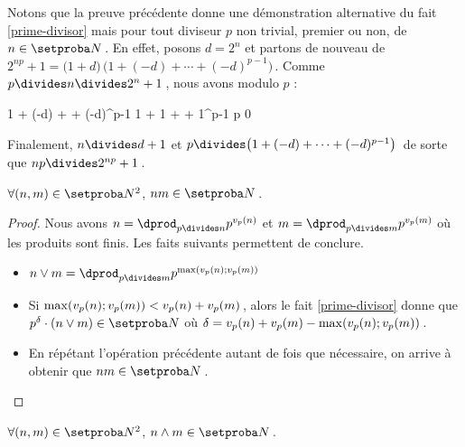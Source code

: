 Notons que la preuve précédente donne une démonstration alternative du fait \ref{prime-divisor} mais pour tout diviseur $p$ non trivial, premier ou non, de $n \in \ourset$\,.
En effet,
posons $d = 2^n$ et partons de nouveau de $2^{np} + 1 = \big( 1 + d \big) \, \big( 1 + (-d) + \cdots + (-d)^{p-1}  \big)$\,.
Comme $p \divides n \divides 2^n + 1$\,, nous avons modulo $p$ :

\medskip

\begin{stepcalc}[style = ar*, ope = \equiv]
	1 + (-d) + \cdots + (-d)^{p-1} 
	1 + 1 + \cdots + 1^{p-1} 
\explnext{}
	p
\explnext{}
	0
\end{stepcalc}

\medskip 

Finalement,
$n \divides d + 1$ et $p \divides \big( 1 + (-d) + \cdots + (-d)^{p-1}  \big)$\, de sorte que $n p \divides 2^{n p} + 1$\,.




\begin{fact} \label{product}
	$\forall (n , m) \in \ourset^2$, $n m \in \ourset$\,.
\end{fact}

\begin{proof}
	Nous avons
	$n = \dprod_{p \divides n} p^{\padicval{n}}$
	et
	$m = \dprod_{p \divides m} p^{\padicval{m}}$
	où les produits sont finis.
	Les faits suivants permettent de conclure.

	\begin{itemize}
		\item $n \vee m = \dprod_{p \divides m} p^{\max ( \padicval{n} ; \padicval{m} )}$

		\item Si $\max ( \padicval{n} ; \padicval{m} ) < \padicval{n} + \padicval{m}$\,, alors le fait \ref{prime-divisor} donne que $p^\delta \cdot ( n \vee m ) \in \ourset$ où $\delta = \padicval{n} + \padicval{m} - \max ( \padicval{n} ; \padicval{m} )$\,.

		\item En répétant l'opération précédente autant de fois que nécessaire, on arrive à obtenir que $n m \in \ourset$\,.
	\end{itemize}
\end{proof}




\begin{fact} \label{gcd}
	$\forall (n , m) \in \ourset^2$, $n \wedge m \in \ourset$\,.
\end{fact}

